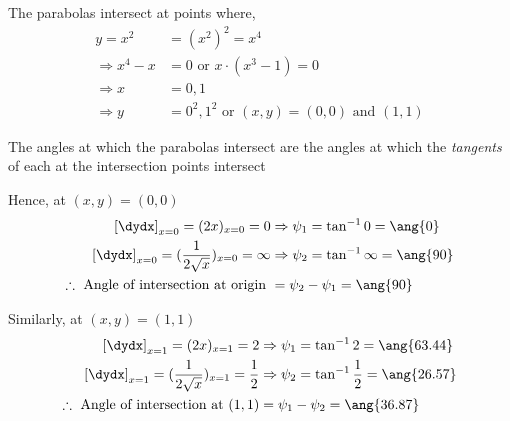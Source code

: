 \begin{solution}[\fullpage]
	The parabolas intersect at points where, 
	\begin{align}
		y = x^2 &= (x^2)^2 = x^4 \\
		\Rightarrow x^4-x &= 0 \text{ or } x\cdot(x^3-1) = 0 \\
		\Rightarrow x &= 0,1 \\
		\Rightarrow y &= 0^2, 1^2 \text{ or } (x,y) = (0,0) \text{ and } (1,1)
	\end{align}
	
	The angles at which the parabolas intersect are the angles at which 
	the \textit{tangents} of each at the intersection points intersect
	
	Hence, at $(x,y) = (0,0)$
	\begin{align}
		\left[\dydx\right]_{x=0} = (2x)_{x=0} = 0 &\Rightarrow \psi_1 = \tan^{-1}0 = \ang{0} \\
		\left[\dydx\right]_{x=0} = (\dfrac{1}{2\sqrt{x}})_{x=0} = \infty &\Rightarrow \psi_2 
		= \tan^{-1}\infty = \ang{90} \\
		\therefore\text{ Angle of intersection at origin } &= \psi_2-\psi_1 = \ang{90}
	\end{align}
	
	Similarly, at $(x,y) = (1,1)$
	\begin{align}
		\left[\dydx\right]_{x=1} = (2x)_{x=1} = 2 &\Rightarrow \psi_1 = \tan^{-1}2 = \ang{63.44} \\
		\left[\dydx\right]_{x=1} = (\dfrac{1}{2\sqrt{x}})_{x=1} = \frac{1}{2} &\Rightarrow \psi_2 
		= \tan^{-1}\frac{1}{2} = \ang{26.57} \\
		\therefore\text{ Angle of intersection at }(1,1) &= \psi_1-\psi_2 = \ang{36.87}
	\end{align}
\end{solution}
